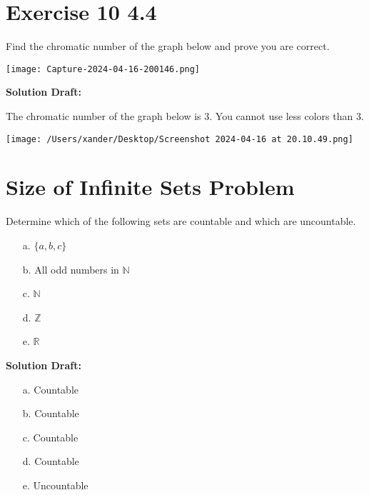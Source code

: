 \documentclass{article}
\begin{document}
\section*{Exercise 10 4.4}  

Find the chromatic number of the graph below and prove you are correct.

\begin{center}
    \texttt{[image: Capture-2024-04-16-200146.png]} %
\end{center}


\vspace{0.5cm}
\noindent\textbf{Solution Draft:} 
\vspace{0.2cm}

The chromatic number of the graph below is 3. You cannot use less colors than 3.

\begin{center}
    \texttt{[image: /Users/xander/Desktop/Screenshot 2024-04-16 at 20.10.49.png]} %
\end{center}


\section*{Size of Infinite Sets Problem}  

Determine which of the following sets are countable and which are uncountable.
\begin{enumerate}
    \item[a.] $\{a, b, c\}$
    \item[b.] All odd numbers in $\mathbb{N}$
    \item[c.] $\mathbb{N}$
    \item[d.] $\mathbb{Z}$
    \item[e.] $\mathbb{R}$
\end{enumerate}

\vspace{0.5cm}
\noindent\textbf{Solution Draft:} 
\vspace{0.2cm}

\begin{enumerate}
    \item[a.] Countable 
    \item[b.] Countable
    \item[c.] Countable
    \item[d.] Countable
    \item[e.] Uncountable
\end{enumerate}

\end{document}
